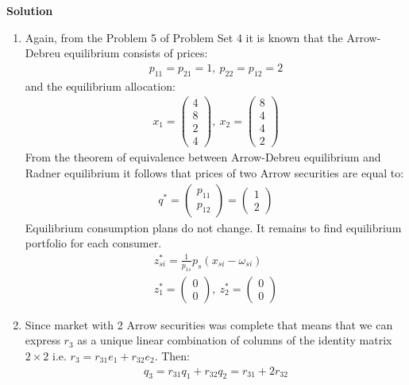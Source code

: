 \documentclass[a4paper]{article}
\begin{document}
\textbf{Solution}

\begin{enumerate}
	\item Again, from the Problem 5 of Problem Set 4 it is known that the Arrow-Debreu equilibrium consists of prices:
	\begin{align*}
	p_{11} = p_{21} = 1,\  p_{22} = p_{12} = 2 
	\end{align*}
	and the equilibrium allocation:
	\begin{align*}
	x_1 = \begin{pmatrix}
	4\\
	8\\
	2\\
	4
	\end{pmatrix},\ x_2 = \begin{pmatrix}
	8\\
	4\\
	4\\
	2
	\end{pmatrix}
	\end{align*}
	From the theorem of equivalence between Arrow-Debreu equilibrium and Radner equilibrium it follows that prices of two Arrow securities are equal to:
	\begin{align*}
	q^* = \begin{pmatrix}
	p_{11}\\
	p_{12}
	\end{pmatrix} = \begin{pmatrix}
	1\\
	2
	\end{pmatrix}
	\end{align*}
	Equilibrium consumption plans do not change. It remains to find equilibrium portfolio for each consumer. 
	\begin{align*}
	z^*_{si} = \frac{1}{p_{1s}}p_s(x_{si} - \omega_{si})\\
	z^*_{1} =  \begin{pmatrix}
	0\\
	0
	\end{pmatrix},\ z^*_{2} = \begin{pmatrix}
	0\\
	0
	\end{pmatrix}
	\end{align*}
	\item Since market with 2 Arrow securities was complete that means that we can express $r_3$ as a unique linear combination of columns of the identity matrix $2 \times 2$ i.e. $r_3 = r_{31} e_1 + r_{32} e_2$. Then:
	\begin{align*}
	q_3 = r_{31} q_1 + r_{32} q_2= r_{31} + 2r_{32}
	\end{align*}
\end{enumerate}
\end{document}
